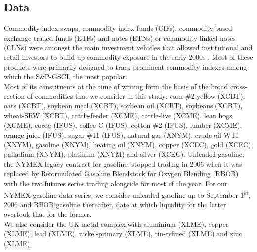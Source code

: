\documentclass[
  authoryear,
  preprint,
  3p]{elsarticle}
\begin{document}
\subsection{Data}\label{sec-data}

Commodity index swaps, commodity index funds (CIFs), commodity-based
exchange traded funds (ETFs) and notes (ETNs) or commodity linked notes
(CLNs) were amongst the main investment vehicles that allowed
institutional and retail investors to build up commodity exposure in the
early 2000s
\citep{boons_stock_2012, henderson_new_2015, irwin_index_2011, unctad_global_2009, schumann_hunger_2011}.
Most of these products were primarily designed to track prominent
commodity indexes among which the S\&P-GSCI, the most popular.\\
Most of its constituents at the time of writing form the basis of the
broad cross-section of commodities that we consider in this study:
corn-\#2 yellow (XCBT), oats (XCBT), soybean meal (XCBT), soybean oil
(XCBT), soybeans (XCBT), wheat-SRW (XCBT), cattle-feeder (XCME),
cattle-live (XCME), lean hogs (XCME), cocoa (IFUS), coffee-C (IFUS),
cotton-\#2 (IFUS), lumber (XCME), orange juice (IFUS), sugar-\#11
(IFUS), natural gas (XNYM), crude oil-WTI (XNYM), gasoline (XNYM),
heating oil (XNYM), copper (XCEC), gold (XCEC), palladium (XNYM),
platinum (XNYM) and silver (XCEC). Unleaded gasoline, the NYMEX legacy
contract for gasoline, stopped trading in 2006 when it was replaced by
Reformulated Gasoline Blendstock for Oxygen Blending (RBOB) with the two
futures series trading alongside for most of the year. For our NYMEX
gasoline data series, we consider unleaded gasoline up to September
1\textsuperscript{st}, 2006 and RBOB gasoline thereafter, date at which
liquidity for the latter overtook that for the former.\\
We also consider the UK metal complex with aluminium (XLME), copper
(XLME), lead (XLME), nickel-primary (XLME), tin-refined (XLME) and zinc
(XLME).

\medskip
\end{document}
